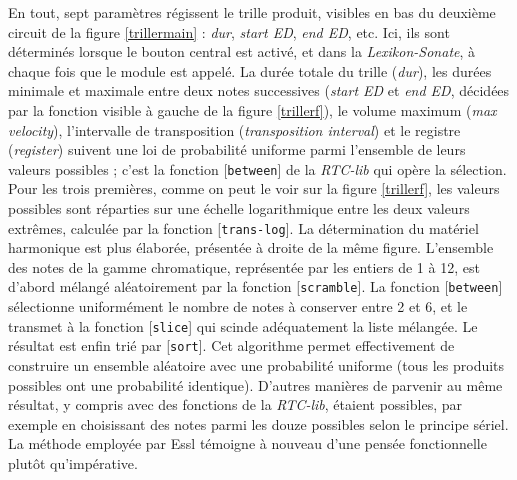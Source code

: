 \documentclass[a4paper,12pt]{article}
\newcommand{\patch}[1]{[\texttt{#1}]}
\begin{document}
En tout, sept paramètres régissent le trille produit, visibles en bas du deuxième circuit de la figure \ref{trillermain} : \emph{dur}, \emph{start ED}, \emph{end ED}, etc. Ici, ils sont déterminés lorsque le bouton central est activé, et dans la \emph{Lexikon-Sonate}, à chaque fois que le module est appelé. La durée totale du trille (\emph{dur}), les durées minimale et maximale entre deux notes successives (\emph{start ED} et \emph{end ED}, décidées par la fonction visible à gauche de la figure \ref{trillerf}), le volume maximum (\emph{max velocity}), l'intervalle de transposition (\emph{transposition interval}) et le registre (\emph{register}) suivent une loi de probabilité uniforme parmi l'ensemble de leurs valeurs possibles ; c'est la fonction \patch{between} de la \emph{RTC-lib} qui opère la sélection. Pour les trois premières, comme on peut le voir sur la figure \ref{trillerf}, les valeurs possibles sont réparties sur une échelle logarithmique entre les deux valeurs extrêmes, calculée par la fonction \patch{trans-log}. La détermination du matériel harmonique est plus élaborée, présentée à droite de la même figure. L'ensemble des notes de la gamme chromatique, représentée par les entiers de 1 à 12, est d'abord mélangé aléatoirement par la fonction \patch{scramble}. La fonction \patch{between} sélectionne uniformément le nombre de notes à conserver entre 2 et 6, et le transmet à la fonction \patch{slice} qui scinde adéquatement la liste mélangée. Le résultat est enfin trié par \patch{sort}. Cet algorithme permet effectivement de construire un ensemble aléatoire avec une probabilité uniforme (tous les produits possibles ont une probabilité identique). D'autres manières de parvenir au même résultat, y compris avec des fonctions de la \emph{RTC-lib}, étaient possibles, par exemple en choisissant des notes parmi les douze possibles selon le principe sériel. La méthode employée par Essl témoigne à nouveau d'une pensée fonctionnelle plutôt qu'impérative.
\end{document}

